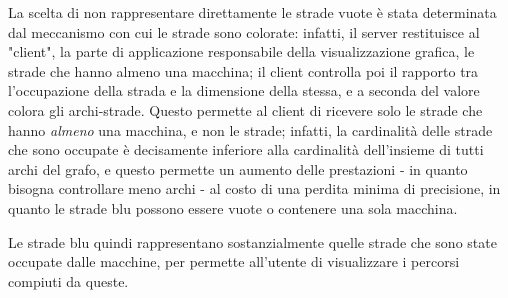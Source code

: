 \documentclass[main.tex]{subfiles}
\begin{document}
{La scelta di non rappresentare direttamente le strade vuote è stata determinata dal meccanismo con cui le strade sono colorate: infatti, il server restituisce al "client", la parte di applicazione responsabile della visualizzazione grafica, le strade che hanno almeno una macchina; il client controlla poi il rapporto tra l'occupazione della strada e la dimensione della stessa, e a seconda del valore colora gli archi-strade. Questo permette al client di ricevere solo le strade che hanno \textit{almeno} una macchina, e non  le strade; infatti, la cardinalità delle strade che sono occupate è decisamente inferiore alla cardinalità dell'insieme di tutti archi del grafo, e questo permette un aumento delle prestazioni - in quanto bisogna controllare meno archi - al costo di una perdita minima di precisione, in quanto le strade blu possono essere vuote o contenere una sola macchina. 

Le strade blu quindi rappresentano sostanzialmente quelle strade che sono state occupate dalle macchine, per permette all'utente di visualizzare i percorsi compiuti da queste. }
\end{document}
